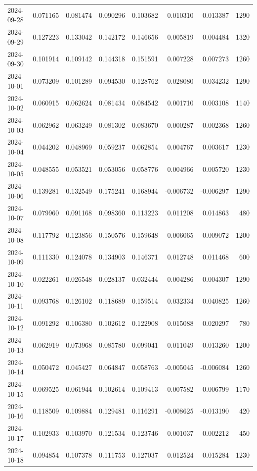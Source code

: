 \begin{tabular}{lrrrrrrr}
2024-09-28 & 0.071165 & 0.081474 & 0.090296 & 0.103682 & 0.010310 & 0.013387 & 1290 \\
2024-09-29 & 0.127223 & 0.133042 & 0.142172 & 0.146656 & 0.005819 & 0.004484 & 1320 \\
2024-09-30 & 0.101914 & 0.109142 & 0.144318 & 0.151591 & 0.007228 & 0.007273 & 1260 \\
2024-10-01 & 0.073209 & 0.101289 & 0.094530 & 0.128762 & 0.028080 & 0.034232 & 1290 \\
2024-10-02 & 0.060915 & 0.062624 & 0.081434 & 0.084542 & 0.001710 & 0.003108 & 1140 \\
2024-10-03 & 0.062962 & 0.063249 & 0.081302 & 0.083670 & 0.000287 & 0.002368 & 1260 \\
2024-10-04 & 0.044202 & 0.048969 & 0.059237 & 0.062854 & 0.004767 & 0.003617 & 1230 \\
2024-10-05 & 0.048555 & 0.053521 & 0.053056 & 0.058776 & 0.004966 & 0.005720 & 1230 \\
2024-10-06 & 0.139281 & 0.132549 & 0.175241 & 0.168944 & -0.006732 & -0.006297 & 1290 \\
2024-10-07 & 0.079960 & 0.091168 & 0.098360 & 0.113223 & 0.011208 & 0.014863 & 480 \\
2024-10-08 & 0.117792 & 0.123856 & 0.150576 & 0.159648 & 0.006065 & 0.009072 & 1200 \\
2024-10-09 & 0.111330 & 0.124078 & 0.134903 & 0.146371 & 0.012748 & 0.011468 & 600 \\
2024-10-10 & 0.022261 & 0.026548 & 0.028137 & 0.032444 & 0.004286 & 0.004307 & 1290 \\
2024-10-11 & 0.093768 & 0.126102 & 0.118689 & 0.159514 & 0.032334 & 0.040825 & 1260 \\
2024-10-12 & 0.091292 & 0.106380 & 0.102612 & 0.122908 & 0.015088 & 0.020297 & 780 \\
2024-10-13 & 0.062919 & 0.073968 & 0.085780 & 0.099041 & 0.011049 & 0.013260 & 1200 \\
2024-10-14 & 0.050472 & 0.045427 & 0.064847 & 0.058763 & -0.005045 & -0.006084 & 1260 \\
2024-10-15 & 0.069525 & 0.061944 & 0.102614 & 0.109413 & -0.007582 & 0.006799 & 1170 \\
2024-10-16 & 0.118509 & 0.109884 & 0.129481 & 0.116291 & -0.008625 & -0.013190 & 420 \\
2024-10-17 & 0.102933 & 0.103970 & 0.121534 & 0.123746 & 0.001037 & 0.002212 & 450 \\
2024-10-18 & 0.094854 & 0.107378 & 0.111753 & 0.127037 & 0.012524 & 0.015284 & 1230 \\

\end{tabular}
